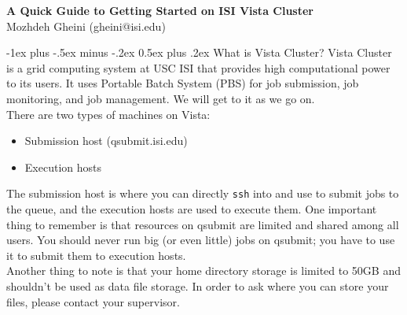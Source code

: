 \documentclass[10pt,landscape]{article}
\title{}
\makeatletter
\renewcommand{\section}{\@startsection{section}{1}{0mm}%
                                {-1ex plus -.5ex minus -.2ex}%
                                {0.5ex plus .2ex}%
                                {\normalfont\large\bfseries}}
\makeatother
\begin{document}
\raggedright
\footnotesize

\begin{center}
     \Large{\textbf{A Quick Guide to Getting Started on ISI Vista Cluster}} \\
     Mozhdeh Gheini (gheini@isi.edu)
\end{center}
\begin{multicols}{3}
\setlength{\premulticols}{1pt}
\setlength{\postmulticols}{1pt}
\setlength{\multicolsep}{1pt}
\setlength{\columnsep}{2pt}

\section{What is Vista Cluster?}
Vista Cluster is a grid computing system at USC ISI that provides high computational power to its users. It uses Portable Batch System (PBS) for job submission, job monitoring, and job management. We will get to it as we go on. \\
There are two types of machines on Vista:
\begin{itemize}
\item Submission host (qsubmit.isi.edu)
\item Execution hosts
\end{itemize}
The submission host is where you can directly \texttt{ssh} into and use to submit jobs to the queue, and the execution hosts are used to execute them. One important thing to remember is that resources on qsubmit are limited and shared among all users. You should never run big (or even little) jobs on qsubmit; you have to use it to submit them to execution hosts. \\
Another thing to note is that your home directory storage is limited to 50GB and shouldn't be used as data file storage. In order to ask where you can store your files, please contact your supervisor.


\end{multicols}
\end{document}
